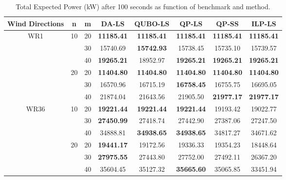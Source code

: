 \documentclass[preprint,12pt]{elsarticle}
\begin{document}
\begin{table}[t!]
	
	\begin{tabular}{| c | c | c | c | c | c | c | c |}
		\toprule
		Wind Directions  & n  & m  & DA-LS  & QUBO-LS  & QP-LS  & QP-SS  & ILP-LS  \\
		\toprule
		\multirow{6}{*}{WR1}  & \multirow{3}{*}{10}       & 20       & \textbf{11185.41} & \textbf{11185.41} & \textbf{11185.41} & \textbf{11185.41} & \textbf{11185.41} \\
		& & 30   & 15740.69 & \textbf{15742.93}  & 15738.45  & 15735.10  & 15739.57     \\
		& & 40 & \textbf{19265.21} & 18952.97 & \textbf{19265.21}  & \textbf{19265.21} & \textbf{19265.21}                \\
		\cline{2-8}
		&\multirow{3}{*}{20}   & 20       & \textbf{11404.80}  & \textbf{11404.80}  & \textbf{11404.80}  & \textbf{11404.80}  & \textbf{11404.80}          \\
		&&30   & 16570.96 & 16715.19  & \textbf{16758.45}  & 16755.75 & 16695.05                  \\
		&&40   & 21874.04 & 21643.56  & 21905.50 & \textbf{21977.17} & \textbf{21977.17}        \\
		\hline
		\multirow{6}{*}{WR36} &  \multirow{3}{*}{10}    & 20       & \textbf{19221.44} & \textbf{19221.44} & \textbf{19221.44} & 19193.42 & 19022.77 \\
		&& 30  & \textbf{27450.99} & 27418.74 & 27442.90 & 27387.06 & 27247.50                     \\
		&&40   & 34888.81 & \textbf{34938.65} & \textbf{34938.65} & 34817.27  & 34671.62          \\
		\cline{2-8}
		&  \multirow{3}{*}{20}   & 20   & \textbf{19441.17}  & 19172.56 & 19336.33 & 19354.23  & 18448.64            \\
		&&30   & \textbf{27975.55} & 27443.80  & 27752.00 & 27492.11  & 26367.20                      \\
		&&40   & 35604.45 & 35127.32 & \textbf{35665.60}   & 35065.85 & 33451.94 \\
		\bottomrule                   
	\end{tabular}
	
	\vspace{0.5em}
	\caption{Total Expected Power (kW) after 100 seconds as function of benchmark and method.}\label{tab:results1}
\end{table}
\end{document}
